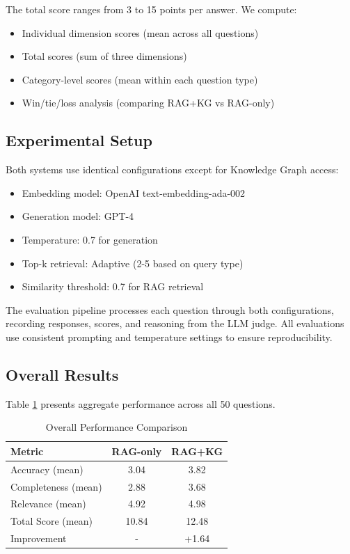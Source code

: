 \documentclass[11pt,twocolumn]{article}
\begin{document}
The total score ranges from 3 to 15 points per answer. We compute:
\begin{itemize}
\item Individual dimension scores (mean across all questions)
\item Total scores (sum of three dimensions)
\item Category-level scores (mean within each question type)
\item Win/tie/loss analysis (comparing RAG+KG vs RAG-only)
\end{itemize}

\subsection{Experimental Setup}

Both systems use identical configurations except for Knowledge Graph access:

\begin{itemize}
\item Embedding model: OpenAI text-embedding-ada-002
\item Generation model: GPT-4
\item Temperature: 0.7 for generation
\item Top-k retrieval: Adaptive (2-5 based on query type)
\item Similarity threshold: 0.7 for RAG retrieval
\end{itemize}

The evaluation pipeline processes each question through both configurations, recording responses, scores, and reasoning from the LLM judge. All evaluations use consistent prompting and temperature settings to ensure reproducibility.

\subsection{Overall Results}

Table \ref{tab:overall_results} presents aggregate performance across all 50 questions.

\begin{table}[h]
\centering
\caption{Overall Performance Comparison}
\label{tab:overall_results}
\begin{tabular}{lcc}
\toprule
\textbf{Metric} & \textbf{RAG-only} & \textbf{RAG+KG} \\
\midrule
Accuracy (mean) & 3.04 & 3.82 \\
Completeness (mean) & 2.88 & 3.68 \\
Relevance (mean) & 4.92 & 4.98 \\
\midrule
Total Score (mean) & 10.84 & 12.48 \\
\midrule
Improvement & - & +1.64 \\
\bottomrule
\end{tabular}
\end{table}
\end{document}
